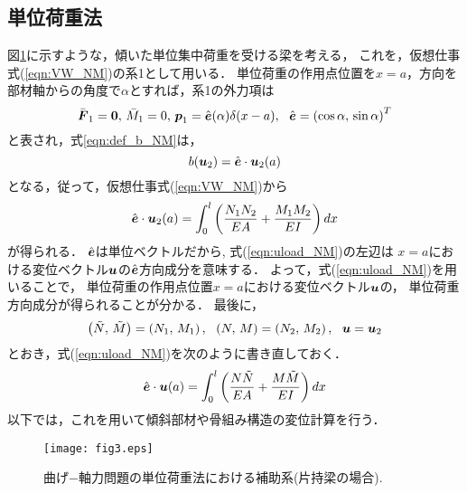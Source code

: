 \documentclass[10pt,a4j]{jarticle}
\begin{document}
\subsection{単位荷重法}
図\ref{fig:fig3}に示すような，傾いた単位集中荷重を受ける梁を考える，
これを，仮想仕事式(\ref{eqn:VW_NM})の系1として用いる．
単位荷重の作用点位置を$x=a$，方向を部材軸からの角度で$\alpha$とすれば，系1の外力項は
\begin{equation}
	\bar{\fat{F}}_1=\fat{0},\, \bar M_1=0, \,
	\fat{p}_1=\hat{\fat{e}}(\alpha)\delta(x-a), \ \ 
	\hat{\fat{e}}=\left( \cos\alpha,\, \sin \alpha \right)^T
	\label{eqn:aux}
\end{equation}
と表され，式\ref{eqn:def_b_NM}は，
\begin{equation}
	b(\mbox{\boldmath $u$}_2)=\hat{\mbox{\boldmath $e$}}\cdot\mbox{\boldmath $u$}_2(a) 
	\label{eqn:dlt_smp}
\end{equation}
となる，従って，仮想仕事式(\ref{eqn:VW_NM})から
\begin{equation}
	\hat{\mbox{\boldmath $e$}}\cdot\mbox{\boldmath $u$}_2(a) 
	=
	\int_0^l \left( \frac{N_1N_2}{EA}+ \frac{M_1M_2}{EI} \right) dx 
	\label{eqn:uload_NM}
\end{equation}
が得られる．
$\hat{\mbox{\boldmath $e$}}$は単位ベクトルだから, 式(\ref{eqn:uload_NM})の左辺は
$x=a$における変位ベクトル$\mbox{\boldmath $u$}$の$\hat{\mbox{\boldmath $e$}}$方向成分を意味する．
よって，式(\ref{eqn:uload_NM})を用いることで，
単位荷重の作用点位置$x=a$における変位ベクトル$\mbox{\boldmath $u$}$の，
単位荷重方向成分が得られることが分かる．
最後に，
\begin{equation}
	\left( \tilde{N},\, \tilde{M}\right)= \left(N_1,\, M_1\right), \ \ 
	\left( N,\, M\right)= \left(N_2,\, M_2\right), \ \ \fat{u}=\fat{u}_2
	\label{eqn:}
\end{equation}
とおき，式(\ref{eqn:uload_NM})を次のように書き直しておく．
\begin{equation}
	\hat{\mbox{\boldmath $e$}}\cdot\mbox{\boldmath $u$}(a) 
	=
	\int_0^l \left( \frac{N \tilde N }{EA}+ \frac{M \tilde M }{EI} \right) dx 
	\label{eqn:uload_NM2}
\end{equation}
以下では，これを用いて傾斜部材や骨組み構造の変位計算を行う．
\begin{figure}[h]
	\begin{center}
	\texttt{[image: fig3.eps]} 
	\end{center}
	\caption{曲げ−軸力問題の単位荷重法における補助系(片持梁の場合).} 
	\label{fig:fig3}
\end{figure}
\end{document}

